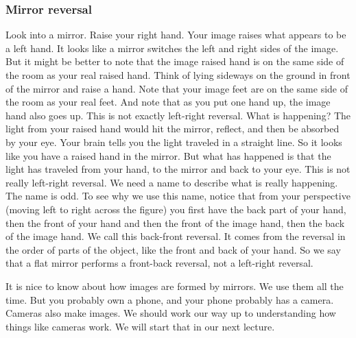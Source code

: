 \documentclass{article}
\begin{document}
\subsubsection{Mirror reversal}

Look into a mirror. Raise your right hand. Your image raises what appears to
be a left hand. It looks like a mirror switches the left and right sides of
the image. But it might be better to note that the image raised hand is on
the same side of the room as your real raised hand. Think of lying sideways
on the ground in front of the mirror and raise a hand. Note that your image
feet are on the same side of the room as your real feet. And note that as
you put one hand up, the image hand also goes up. This is not exactly
left-right reversal. What is happening? The light from your raised hand
would hit the mirror, reflect, and then be absorbed by your eye. Your brain
tells you the light traveled in a straight line. So it looks like you have a
raised hand in the mirror. But what has happened is that the light has
traveled from your hand, to the mirror and back to your eye. This is not
really left-right reversal. We need a name to describe what is really
happening. The name is odd. To see why we use this name, notice that from
your perspective (moving left to right across the figure) you first have the
back part of your hand, then the front of your hand and then the front of
the image hand, then the back of the image hand. We call this back-front
reversal. It comes from the reversal in the order of parts of the object,
like the front and back of your hand. So we say that a flat mirror performs
a front-back reversal, not a left-right reversal.

It is nice to know about how images are formed by mirrors. We use them all
the time. But you probably own a phone, and your phone probably has a
camera. Cameras also make images. We should work our way up to understanding
how things like cameras work. We will start that in our next lecture.
\end{document}
